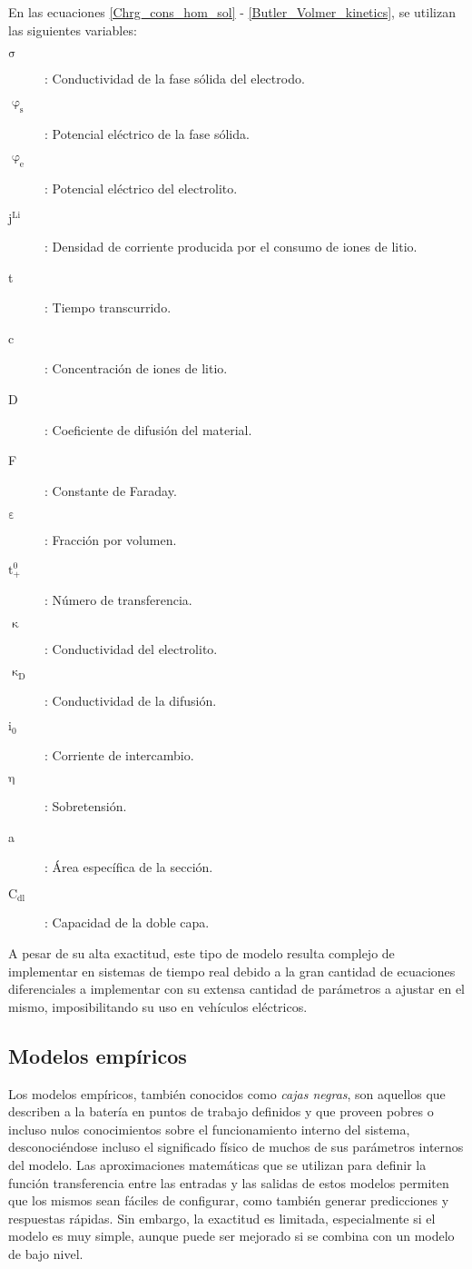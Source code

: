 En las ecuaciones \ref{Chrg_cons_hom_sol} - \ref{Butler_Volmer_kinetics}, se 
utilizan las siguientes variables:

\begin{description}
    \item [$\mathrm{\sigma}$]: Conductividad de la fase s\'olida del
        electrodo.
    \item [$\mathrm{\upvarphi_s}$]: Potencial el\'ectrico de la fase
        s\'olida.
    \item [$\mathrm{\upvarphi_e}$]: Potencial el\'ectrico del
        electrolito.
    \item [$\mathrm{j^{Li}}$]: Densidad de corriente producida por el
        consumo de iones de litio.
    \item [t]: Tiempo transcurrido.
    \item [c]: Concentraci\'on de iones de litio.
    \item [D]: Coeficiente de difusi\'on del material.
    \item [F]: Constante de Faraday.
    \item [$\mathrm{\varepsilon}$]: Fracci\'on por volumen.
    \item [$\mathrm{t_+^0}$]: N\'umero de transferencia.
    \item [$\mathrm{\upkappa}$]: Conductividad del electrolito.
    \item [$\mathrm{\upkappa_D}$]: Conductividad de la difusi\'on.
    \item [$\mathrm{i_0}$]: Corriente de intercambio.
    \item [$\mathrm{\eta}$]: Sobretensi\'on.
    \item [a]: \'Area espec\'ifica de la secci\'on.
    \item [$\mathrm{C_{dl}}$]: Capacidad de la doble capa.
\end{description}

A pesar de su alta exactitud, este tipo de modelo resulta complejo de
implementar en sistemas de tiempo real debido a la gran cantidad de ecuaciones
diferenciales a implementar con su extensa cantidad de par\'ametros a ajustar en
el mismo, imposibilitando su uso en veh\'iculos el\'ectricos.

\subsection{Modelos emp\'iricos}\label{empModels}

\noindent Los modelos emp\'iricos, tambi\'en conocidos como \emph{cajas negras},
son aquellos que describen a la batería en puntos de trabajo definidos y que
proveen pobres o incluso nulos conocimientos sobre el funcionamiento interno del
sistema, desconociéndose incluso el significado f\'isico de muchos de sus
par\'ametros internos del modelo. Las aproximaciones matem\'aticas que se
utilizan para definir la funci\'on transferencia entre las entradas y las
salidas de estos modelos permiten que los mismos sean f\'aciles de configurar,
como tambi\'en generar predicciones y respuestas r\'apidas. Sin embargo, la
exactitud es limitada, especialmente si el modelo es muy simple, aunque puede
ser mejorado si se combina con un modelo de bajo nivel.

